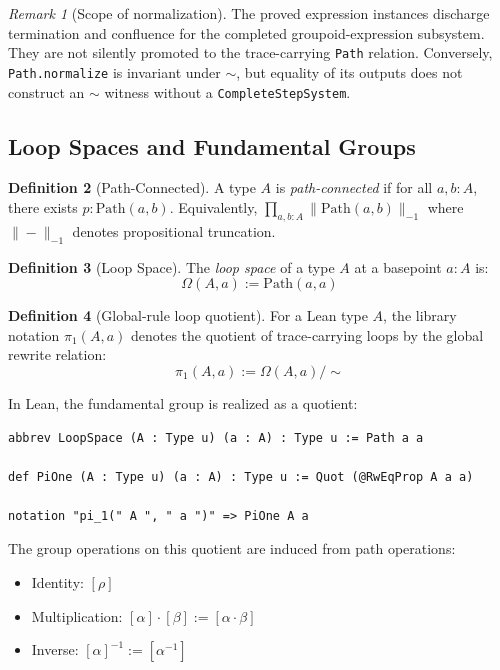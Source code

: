 \documentclass{lmcs}
\theoremstyle{definition}
\newtheorem{definition}{Definition}[section]
\theoremstyle{plain}
\theoremstyle{remark}
\newtheorem{remark}[definition]{Remark}
\newcommand{\refl}{\rho}
\newcommand{\RwEq}{\sim}
\newcommand{\Path}{\mathrm{Path}}
\newcommand{\piOne}{\pi_1}
\begin{document}
\begin{remark}[Scope of normalization]
The proved expression instances discharge termination and confluence for the
completed groupoid-expression subsystem.  They are not silently promoted to
the trace-carrying \texttt{Path} relation.  Conversely,
\texttt{Path.normalize} is invariant under $\RwEq$, but equality of its outputs
does not construct an $\RwEq$ witness without a
\texttt{CompleteStepSystem}.
\end{remark}

\subsection{Loop Spaces and Fundamental Groups}

\begin{definition}[Path-Connected]
\label{def:path-connected}
A type $A$ is \emph{path-connected} if for all $a, b : A$, there exists $p : \Path(a, b)$. Equivalently, $\prod_{a, b : A} \|\Path(a, b)\|_{-1}$ where $\|-\|_{-1}$ denotes propositional truncation.
\end{definition}

\begin{definition}[Loop Space]
The \emph{loop space} of a type $A$ at a basepoint $a : A$ is:
\[
\Omega(A, a) := \Path(a, a)
\]
\end{definition}

\begin{definition}[Global-rule loop quotient]
For a Lean type \(A\), the library notation $\piOne(A, a)$ denotes the quotient
of trace-carrying loops by the global rewrite relation:
\[
\piOne(A, a) := \Omega(A, a) / {\RwEq}
\]
\end{definition}

In Lean, the fundamental group is realized as a quotient:
\begin{lstlisting}
abbrev LoopSpace (A : Type u) (a : A) : Type u := Path a a

def PiOne (A : Type u) (a : A) : Type u := Quot (@RwEqProp A a a)

notation "pi_1(" A ", " a ")" => PiOne A a
\end{lstlisting}

The group operations on this quotient are induced from path operations:
\begin{itemize}
    \item Identity: $[\refl]$
    \item Multiplication: $[\alpha] \cdot [\beta] := [\alpha \cdot \beta]$
    \item Inverse: $[\alpha]^{-1} := [\alpha^{-1}]$
\end{itemize}
\end{document}
